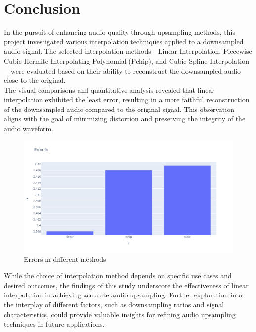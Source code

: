 \documentclass{article}
\begin{document}
\newpage

\section{Conclusion}

In the pursuit of enhancing audio quality through upsampling methods, this project investigated various interpolation techniques applied to a downsampled audio signal. The selected interpolation methods—Linear Interpolation, Piecewise Cubic Hermite Interpolating Polynomial (Pchip), and Cubic Spline Interpolation—were evaluated based on their ability to reconstruct the downsampled audio close to the original. \\

The visual comparisons and quantitative analysis revealed that linear interpolation exhibited the least error, resulting in a more faithful reconstruction of the downsampled audio compared to the original signal. This observation aligns with the goal of minimizing distortion and preserving the integrity of the audio waveform.


\begin{figure}[h]
    \centering
    \includegraphics[width=\textwidth]{conclusion.png}
    \caption{Errors in different methods}
    \label{fig:conclusion}
\end{figure}


While the choice of interpolation method depends on specific use cases and desired outcomes, the findings of this study underscore the effectiveness of linear interpolation in achieving accurate audio upsampling. Further exploration into the interplay of different factors, such as downsampling ratios and signal characteristics, could provide valuable insights for refining audio upsampling techniques in future applications.

\newpage
\printbibliography[title={References}]
\end{document}
